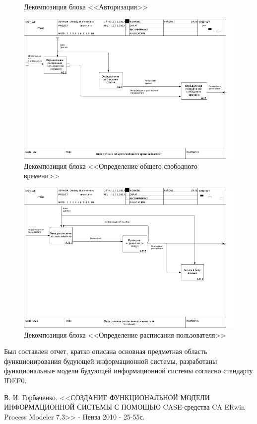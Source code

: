 \documentclass[14pt]{extreport}
\begin{document}
\begin{landscape}
\begin{figure}[h]
        \caption{ Декомпозиция блока <<Авторизация>>}
        \label{fig:d3}
    \end{figure}
    \begin{figure}[h]   
        \centering
        \includegraphics[width=1\linewidth]{img/04_A2.png}
        \caption{ Декомпозиция блока <<Определение общего свободного времени>>}
        \label{fig:d4}
    \end{figure}
    \begin{figure}[h]   
        \centering
        \includegraphics[width=1\linewidth]{img/05_A21.png}
        \caption{ Декомпозиция блока <<Определение расписания пользователя>>}
        \label{fig:d5}
    \end{figure}
    
\end{landscape}

\conclusions

Был составлен отчет, кратко описана основная предметная область функционирования будующей информационной системы, разработаны функциональные модели будующей информационной системы согласно стандарту IDEF0.

\newpage
\begin{thebibliography}{99}
	 	\label{bib:bib1} В. И. Горбаченко. <<СОЗДАНИЕ ФУНКЦИОНАЛЬНОЙ МОДЕЛИ ИНФОРМАЦИОННОЙ СИСТЕМЫ С ПОМОЩЬЮ CASE-средства CA ERwin Process Modeler 7.3>> - Пенза 2010 - 25-55с.
\end{thebibliography}
\end{document}
